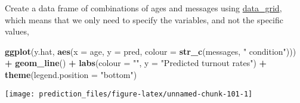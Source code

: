 \documentclass[]{book}
\newenvironment{Shaded}{\begin{snugshade}}{\end{snugshade}}
\newcommand{\KeywordTok}[1]{\textcolor[rgb]{0.13,0.29,0.53}{\textbf{#1}}}
\newcommand{\DataTypeTok}[1]{\textcolor[rgb]{0.13,0.29,0.53}{#1}}
\newcommand{\DecValTok}[1]{\textcolor[rgb]{0.00,0.00,0.81}{#1}}
\newcommand{\FloatTok}[1]{\textcolor[rgb]{0.00,0.00,0.81}{#1}}
\newcommand{\StringTok}[1]{\textcolor[rgb]{0.31,0.60,0.02}{#1}}
\newcommand{\OperatorTok}[1]{\textcolor[rgb]{0.81,0.36,0.00}{\textbf{#1}}}
\newcommand{\NormalTok}[1]{#1}
\theoremstyle{definition}
\theoremstyle{definition}
\theoremstyle{definition}
\theoremstyle{remark}
\begin{document}
Create a data frame of combinations of ages and messages using
\href{https://www.rdocumentation.org/packages/modelr/topics/data_grid}{data\_grid},
which means that we only need to specify the variables, and not the
specific values,

\begin{Shaded}
\end{Shaded}

\begin{Shaded}
\begin{Highlighting}[]
\KeywordTok{ggplot}\NormalTok{(y.hat, }\KeywordTok{aes}\NormalTok{(}\DataTypeTok{x =}\NormalTok{ age, }\DataTypeTok{y =}\NormalTok{ pred,}
                  \DataTypeTok{colour =} \KeywordTok{str_c}\NormalTok{(messages, }\StringTok{" condition"}\NormalTok{))) }\OperatorTok{+}
\StringTok{  }\KeywordTok{geom_line}\NormalTok{() }\OperatorTok{+}
\StringTok{  }\KeywordTok{labs}\NormalTok{(}\DataTypeTok{colour =} \StringTok{""}\NormalTok{, }\DataTypeTok{y =} \StringTok{"Predicted turnout rates"}\NormalTok{) }\OperatorTok{+}
\StringTok{  }\KeywordTok{theme}\NormalTok{(}\DataTypeTok{legend.position =} \StringTok{"bottom"}\NormalTok{)}
\end{Highlighting}
\end{Shaded}

\begin{center}\texttt{[image: prediction\_files/figure-latex/unnamed-chunk-101-1]} \end{center}

\begin{Shaded}
\end{Shaded}
\end{document}
